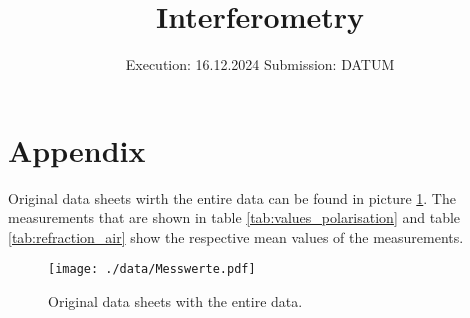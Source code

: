 

\subject{v64}
\title{Interferometry}
\date{%
  Execution: 16.12.2024
  \hspace{3em}
  Submission: DATUM
}



\maketitle
\thispagestyle{empty}
\tableofcontents
\newpage






\printbibliography{}

\appendix
\newpage

\section{Appendix}
\label{sec:appendix}

Original data sheets wirth the entire data can be found in picture \ref{fig:original_data}.
The measurements that are shown in table \ref{tab:values_polarisation} and table \ref{tab:refraction_air} show the respective mean values of the measurements.

\begin{figure}[H]
    \centering
    \texttt{[image: ./data/Messwerte.pdf]}
    \caption{Original data sheets with the entire data.}
    \label{fig:original_data}
\end{figure}



